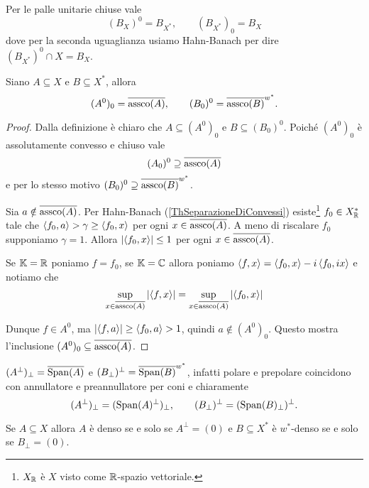 \begin{remark}
Per le palle unitarie chiuse vale
\[(B_X)^0=B_{X^\ast},\qquad (B_{X^\ast})_0=B_X\]
dove per la seconda uguaglianza usiamo Hahn-Banach per dire $(B_{X^\ast})^0\cap X=B_X$.
\end{remark}

\begin{proposition}
Siano $A\subseteq X$ e $B\subseteq X^\ast$, allora
\[(A^0)_0=\overline{\operatorname{assco}(A)},\qquad (B_0)^0=\overline{\operatorname{assco}(B)}^{w^\ast}.\]
\end{proposition}
\begin{proof}
Dalla definizione \`e chiaro che $A\subseteq (A^0)_0$ e $B\subseteq (B_0)^0$. Poich\'e $(A^0)_0$ \`e assolutamente convesso e chiuso vale
\[(A_0)^0\supseteq\overline{\operatorname{assco}(A)}\]
e per lo stesso motivo $(B_0)^0\supseteq \overline{\operatorname{assco}(B)}^{w^\ast}$.

Sia $a\notin \overline{\operatorname{assco}(A)}$. Per Hahn-Banach (\ref{ThSeparazioneDiConvessi}) esiste\footnote{$X_{\mathbb{R}}$ \`e $X$ visto come $\mathbb{R}$-spazio vettoriale.} $f_0\in X_{\mathbb{R}}^\ast$ tale che $\left\langle {f_0,a}\right\rangle>\gamma\geq \left\langle {f_0,x}\right\rangle$ per ogni $x\in \overline{\operatorname{assco}(A)}$. A meno di riscalare $f_0$ supponiamo $\gamma=1$. Allora $\left|{\left\langle {f_0,x}\right\rangle}\right|\leq 1$ per ogni $x\in \overline{\operatorname{assco}(A)}$. 

Se $\mathbb{K}=\mathbb{R}$ poniamo $f=f_0$, se $\mathbb{K}=\mathbb{C}$ allora poniamo $\left\langle {f,x}\right\rangle=\left\langle {f_0,x}\right\rangle-i\left\langle {f_0,ix}\right\rangle$ e notiamo che
\[\sup_{x\in\overline{\operatorname{assco}(A)}}\left|{\left\langle {f,x}\right\rangle}\right|=\sup_{x\in\overline{\operatorname{assco}(A)}}\left|{\left\langle {f_0,x}\right\rangle}\right|\]

Dunque $f\in A^0$, ma $\left|{\left\langle {f,a}\right\rangle}\right|\geq \left\langle {f_0,a}\right\rangle>1$, quindi $a\notin (A^0)_0$. Questo mostra l'inclusione $(A^0)_0\subseteq \overline{\operatorname{assco}(A)}$.
\end{proof}

\begin{remark}
$(A^\perp)_\perp=\overline{\operatorname{Span}(A)}$ e $(B_\perp)^\perp=\overline{\operatorname{Span}(B)}^{w^\ast}$, infatti polare e prepolare coincidono con annullatore e preannullatore per coni e chiaramente 
\[(A^\perp)_\perp=(\operatorname{Span}(A)^\perp)_\perp,\qquad (B_\perp)^\perp=(\operatorname{Span}(B)_\perp)^\perp.\]
\end{remark}

\begin{remark}
Se $A\subseteq X$ allora $A$ \`e denso se e solo se $A^\perp=(0)$ e $B\subseteq X^\ast$ \`e $w^\ast$-denso se e solo se $B_\perp=(0)$.
\end{remark}


